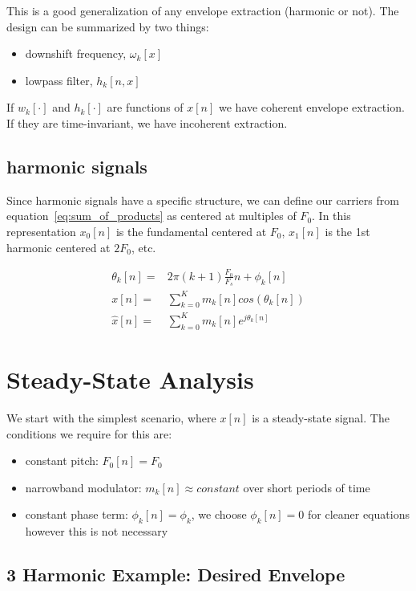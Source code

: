 \documentclass [11pt, proquest] {uwthesis}[2015/03/03]
\begin{document}
This is a good generalization of any envelope extraction (harmonic or not). The design can be summarized by two things:

\begin{itemize}
\item downshift frequency, $\omega_k[x]$
\item lowpass filter, $h_k[n,x]$
\end{itemize}

If $w_k[\cdot]$ and $h_k[\cdot]$ are functions of $x[n]$ we have coherent envelope extraction.  If they are time-invariant, we have incoherent extraction.

\subsection{harmonic signals}

Since harmonic signals have a specific structure, we can define our carriers from equation~\ref{eq:sum_of_products} as centered at multiples of $F_0$. In this representation $x_0[n]$ is the fundamental centered at $F_0$, $x_1[n]$ is the 1st harmonic centered at $2F_0$, etc.

\begin{align}
\theta_k[n] =& 2\pi(k+1)\frac{F_0}{F_s}n + \phi_k[n] \\
x[n] =& \sum\limits_{k=0}^K m_k[n] cos(\theta_k[n]) \\
\widehat{x}[n] =& \sum\limits_{k=0}^K m_k[n] e^{j\theta_k[n]}
\end{align}


\section{Steady-State Analysis}

We start with the simplest scenario, where $x[n]$ is a steady-state signal.  The conditions we require for this are:

\begin{itemize}
\item constant pitch: $F_0[n] = F_0$
\item narrowband modulator: $m_k[n] \approx constant$ over short periods of time
\item constant phase term: $\phi_k[n] = \phi_k$, we choose $\phi_k[n] = 0$ for cleaner equations however this is not necessary
\end{itemize}

\subsection{3 Harmonic Example: Desired Envelope}
\end{document}
